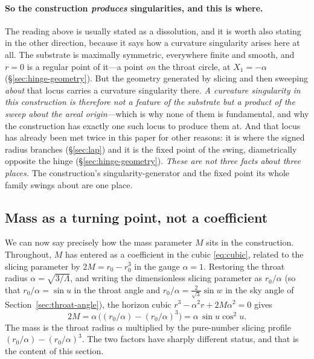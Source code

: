 \documentclass[11pt,a4paper]{article}
\theoremstyle{definition}
\begin{document}
\paragraph{So the construction \emph{produces} singularities, and this is where.} The reading above is usually stated as a dissolution, and it is worth also stating in the other direction, because it says how a curvature singularity arises here at all. The substrate is maximally symmetric, everywhere finite and smooth, and $r=0$ is a regular point of it---a point \emph{on} the throat circle, at $X_{1}=-\alpha$ (\S\ref{sec:hinge-geometry}). But the geometry generated by slicing and then sweeping \emph{about} that locus carries a curvature singularity there. \emph{A curvature singularity in this construction is therefore not a feature of the substrate but a product of the sweep about the areal origin}---which is why none of them is fundamental, and why the construction has exactly one such locus to produce them at. And that locus has already been met twice in this paper for other reasons: it is where the signed radius branches (\S\ref{sec:lap}) and it is the fixed point of the swing, diametrically opposite the hinge (\S\ref{sec:hinge-geometry}). \emph{These are not three facts about three places.} The construction's singularity-generator and the fixed point its whole family swings about are one place.

\subsection{Mass as a turning point, not a coefficient}\label{sec:mass}

We can now say precisely how the mass parameter $M$ sits in the construction. Throughout, $M$ has entered as a coefficient in the cubic \eqref{eq:cubic}, related to the slicing parameter by $2M=r_{0}-r_{0}^{3}$ in the gauge $\alpha=1$. Restoring the throat radius $\alpha=\sqrt{3/\Lambda}$, and writing the dimensionless slicing parameter as $r_{0}/\alpha$ (so that $r_{0}/\alpha=\sin u$ in the throat angle and $r_{0}/\alpha=\tfrac{2}{\sqrt3}\sin w$ in the sky angle of Section~\ref{sec:throat-angle}), the horizon cubic $r^{3}-\alpha^{2}r+2M\alpha^{2}=0$ gives
\begin{equation}\label{eq:Malpha}
  2M=\alpha\,\bigl((r_{0}/\alpha)-(r_{0}/\alpha)^{3}\bigr)=\alpha\,\sin u\cos^{2}u .
\end{equation}
The mass is the throat radius $\alpha$ multiplied by the pure-number slicing profile $(r_{0}/\alpha)-(r_{0}/\alpha)^{3}$. The two factors have sharply different status, and that is the content of this section.
\end{document}
